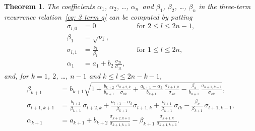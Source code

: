 \documentclass[12pt,a4paper]{article}
\newtheorem{theorem}{Theorem}
\begin{document}
\begin{theorem}
The coefficients $\alpha_1$, $\alpha_2$, \dots, $\alpha_n$~and 
$\beta_1$, $\beta_2$, \dots, $\beta_n$ in the three-term 
recurrence relation~\eqref{eq: 3 term q} can be computed by putting
\[
\begin{aligned}
\sigma_{l,0}&=0&&\text{for $2\le l\le 2n-1$},\\
\beta_1&=\sqrt{\nu_1},\\
\sigma_{l,1}&=\frac{\nu_l}{\beta_1}&
	&\text{for $1\le l\le2n$},\\
\alpha_1&=a_1+b_2\,\frac{\sigma_{21}}{\sigma_{11}},
\end{aligned} 
\]
and, for $k=1$, $2$, \dots, $n-1$ and $k\le l\le2n-k-1$, 
\[
\begin{aligned}
\beta_{k+1}&=b_{k+1}\sqrt{1
		+\frac{b_{k+2}}{b_{k+1}}\,\frac{\sigma_{k+2,k}}{\sigma_{kk}}
		+\frac{a_{k+1}-\alpha_k}{b_{k+1}}\,
			\frac{\sigma_{k+1,k}}{\sigma_{kk}}
		-\frac{\beta_k}{b_{k+1}}\,
			\frac{\sigma_{k+1,k-1}}{\sigma_{kk}}},\\
\sigma_{l+1,k+1}&=\frac{b_{l+2}}{\beta_{k+1}}\,\sigma_{l+2,k}
	+\frac{a_{l+1}-\alpha_k}{\beta_{k+1}}\sigma_{l+1,k}
	+\frac{b_{l+1}}{\beta_{k+1}}\,\sigma_{lk}
	-\frac{\beta_k}{\beta_{k+1}}\,\sigma_{l+1,k-1},\\
\alpha_{k+1}&=a_{k+1}+b_{k+2}\,
	\frac{\sigma_{k+2,k+1}}{\sigma_{k+1,k+1}}
	-\beta_{k+1}\,\frac{\sigma_{k+1,k}}{\sigma_{k+1,k+1}}.
\end{aligned}
\]
\end{theorem}
\end{document}
